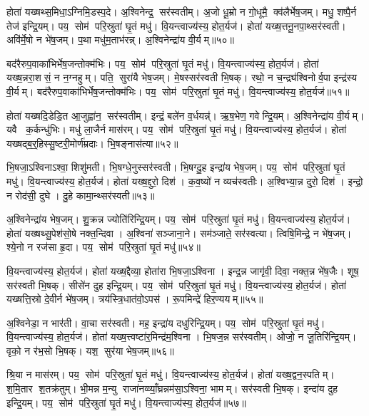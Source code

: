 होता॑ यख्षथ्स॒मिधा॒ऽग्निमि॒डस्प॒दे। अ॒श्विनेन्द्र॒ सर॑स्वतीम्। अ॒जो धू॒म्रो न गो॒धूमै॒ क्व॑लैर्भेष॒जम्। मधु॒ शष्पै॒र्न तेज॑ इन्द्रि॒यम्। पय॒ सोम॑ परि॒स्रुता॑ घृ॒तं मधु॑। वि॒यन्त्वाज्य॑स्य॒ होत॒र्यज॑। होता॑ यख्ष॒त्तनू॒नपा॒थ्सर॑स्वती। अवि॑र्मे॒षो न भे॑ष॒जम्। प॒था मधु॑म॒ताभ॑रन्न्। अ॒श्विनेन्द्रा॑य वी॒र्यम्॥५०॥

बद॑रैरुप॒वाका॑भिर्भेष॒जन्तोक्म॑भिः। पय॒ सोम॑ परि॒स्रुता॑ घृ॒तं मधु॑। वि॒यन्त्वाज्य॑स्य॒ होत॒र्यज॑। होता॑ यख्ष॒न्नरा॒शसं॒ न न॒ग्नहुम्। पति॒ सुरा॑यै भेष॒जम्। मे॒षस्सर॑स्वती भि॒षक्। रथो॒ न च॒न्द्र्य॑श्विनोर्व॒पा इन्द्र॑स्य वी॒र्यम्। बद॑रैरुप॒वाका॑भिर्भेष॒जन्तोक्म॑भिः। पय॒ सोम॑ परि॒स्रुता॑ घृ॒तं मधु॑। वि॒यन्त्वाज्य॑स्य॒ होत॒र्यज॑॥५१॥

होता॑ यख्षदि॒डेडि॒त आ॒जुह्वा॑न॒ सर॑स्वतीम्। इन्द्रं॒ बले॑न व॒र्धयन्न्॑। ऋ॒ष॒भेण॒ गवेन्द्रि॒यम्। अ॒श्विनेन्द्रा॑य वी॒र्यम्। यवै क॒र्कन्धु॑भिः। मधु॑ ला॒जैर्न मास॑रम्। पय॒ सोम॑ परि॒स्रुता॑ घृ॒तं मधु॑। वि॒यन्त्वाज्य॑स्य॒ होत॒र्यज॑। होता॑ यख्षद्ब॒र्॒हिस्सु॒ष्टरी॒मोर्ण॑म्रदाः। भि॒षङ्नास॑त्या॥५२॥

भि॒षजा॒ऽश्विनाऽश्वा॒ शिशु॑मती। भि॒षग्धे॒नुस्सर॑स्वती। भि॒षग्दु॒ह इन्द्रा॑य भेष॒जम्। पय॒ सोम॑ परि॒स्रुता॑ घृ॒तं मधु॑। वि॒यन्त्वाज्य॑स्य॒ होत॒र्यज॑। होता॑ यख्ष॒द्दुरो॒ दिश॑। क॒व॒ष्यो॑ न व्यच॑स्वतीः। अ॒श्विभ्या॒न्न दुरो॒ दिश॑। इन्द्रो॒ न रोद॑सी॒ दुघे। दु॒हे कामा॒न्थ्सर॑स्वती॥५३॥

अ॒श्विनेन्द्रा॑य भेष॒जम्। शु॒क्रन्न ज्योति॑रिन्द्रि॒यम्। पय॒ सोम॑ परि॒स्रुता॑ घृ॒तं मधु॑। वि॒यन्त्वाज्य॑स्य॒ होत॒र्यज॑। होता॑ यख्षथ्सु॒पेश॑सो॒षे नक्त॒न्दिवा। अ॒श्विना॑ सञ्जाना॒ने। सम॑ञ्जाते॒ सर॑स्वत्या। त्विषि॒मिन्द्रे॒ न भे॑ष॒जम्। श्ये॒नो न रज॑सा हृ॒दा। पय॒ सोम॑ परि॒स्रुता॑ घृ॒तं मधु॑॥५४॥

वि॒यन्त्वाज्य॑स्य॒ होत॒र्यज॑। होता॑ यख्ष॒द्दैव्या॒ होता॑रा भि॒षजा॒ऽश्विना। इन्द्र॒न्न जागृ॑वी॒ दिवा॒ नक्त॒न्न भे॑ष॒जैः। शूष॒ सर॑स्वती भि॒षक्। सीसे॑न दुह इन्द्रि॒यम्। पय॒ सोम॑ परि॒स्रुता॑ घृ॒तं मधु॑। वि॒यन्त्वाज्य॑स्य॒ होत॒र्यज॑। होता॑ यख्षत्ति॒स्रो दे॒वीर्न भे॑ष॒जम्। त्रय॑स्त्रि॒धात॑वो॒ऽपस॑। रू॒पमिन्द्रे॑ हिर॒ण्ययम्॥५५॥

अ॒श्विनेडा॒ न भार॑ती। वा॒चा सर॑स्वती। मह॒ इन्द्रा॑य दधुरिन्द्रि॒यम्। पय॒ सोम॑ परि॒स्रुता॑ घृ॒तं मधु॑। वि॒यन्त्वाज्य॑स्य॒ होत॒र्यज॑। होता॑ यख्ष॒त्त्वष्टा॑र॒मिन्द्र॑म॒श्विना। भि॒षज॒न्न सर॑स्वतीम्। ओजो॒ न जू॒तिरि॑न्द्रि॒यम्। वृको॒ न र॑भ॒सो भि॒षक्। यश॒ सुर॑या भेष॒जम्॥५६॥

श्रि॒या न मास॑रम्। पय॒ सोम॑ परि॒स्रुता॑ घृ॒तं मधु॑। वि॒यन्त्वाज्य॑स्य॒ होत॒र्यज॑। होता॑ यख्ष॒द्वन॒स्पतिम्। श॒मि॒तार श॒तक्र॑तुम्। भी॒मन्न म॒न्यु राजा॑नव्व्याँ॒घ्रन्नम॑सा॒ऽश्विना॒ भामम्। सर॑स्वती भि॒षक्। इन्दा॑य दुह इन्द्रि॒यम्। पय॒ सोम॑ परि॒स्रुता॑ घृ॒तं मधु॑। वि॒यन्त्वाज्य॑स्य॒ होत॒र्यज॑॥५७॥

